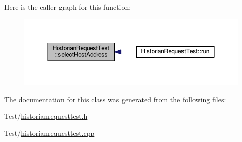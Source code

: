 Here is the caller graph for this function\+:
\nopagebreak
\begin{figure}[H]
\begin{center}
\leavevmode
\includegraphics[width=350pt]{class_historian_request_test_a33e035ef4a4374cfe7c34199f6163212_icgraph}
\end{center}
\end{figure}




The documentation for this class was generated from the following files\+:\begin{DoxyCompactItemize}
\item 
Test/\hyperlink{historianrequesttest_8h}{historianrequesttest.\+h}\item 
Test/\hyperlink{historianrequesttest_8cpp}{historianrequesttest.\+cpp}\end{DoxyCompactItemize}
